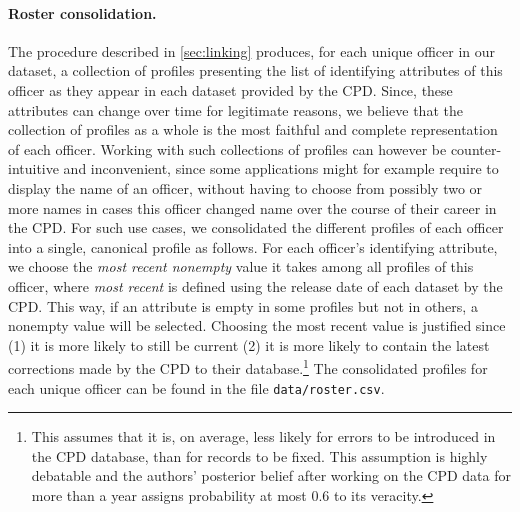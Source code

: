 \paragraph{Roster consolidation.}
The procedure described in \cref{sec:linking} produces, for each unique officer
in our dataset, a collection of profiles presenting the list of identifying
attributes of this officer as they appear in each dataset provided by the CPD.
Since, these attributes can change over time for legitimate reasons, we believe
that the collection of profiles as a whole is the most faithful and complete
representation of each officer. Working with such collections of profiles can
however be counter-intuitive and inconvenient, since some applications might
for example require to display the name of an officer, without having to choose
from possibly two or more names in cases this officer changed name over the
course of their career in the CPD. For such use cases, we consolidated the
different profiles of each officer into a single, canonical profile as follows.
For each officer's identifying attribute, we choose the \emph{most recent
nonempty} value it takes among all profiles of this officer, where \emph{most
recent} is defined using the release date of each dataset by the CPD. This way,
if an attribute is empty in some profiles but not in others, a nonempty value
will be selected. Choosing the most recent value is justified since (1) it is
more likely to still be current (2) it is more likely to contain the latest
corrections made by the CPD to their database.\footnote{This assumes that it
is, on average, less likely for errors to be introduced in the CPD database,
than for records to be fixed. This assumption is highly debatable and the
authors' posterior belief after working on the CPD data for more than a year
assigns probability at most $0.6$ to its veracity.} The consolidated profiles
for each unique officer can be found in the file \texttt{data/roster.csv}.

